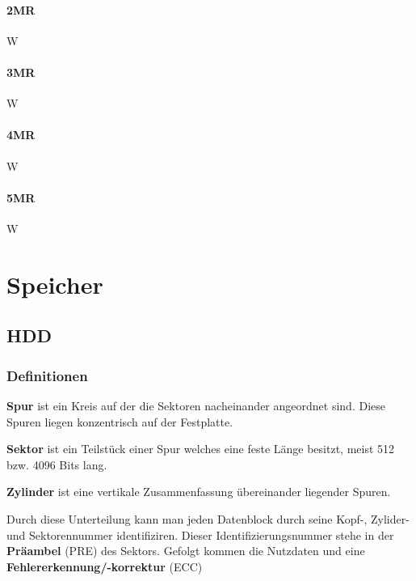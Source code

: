 \documentclass[a4paper, landscape]{article}
\newcommand*\spaceline{\par\vspace{\belowdisplayskip}}
\begin{document}
\begin{multicols}{3}
        \paragraph{2MR} W
        
        \paragraph{3MR} W
        
        \paragraph{4MR} W
        
        \paragraph{5MR} W
        
        \section{Speicher}
        
        \subsection{HDD}
        
        \subsubsection{Definitionen}
        \textbf{Spur} ist ein Kreis auf der die Sektoren nacheinander angeordnet sind. Diese Spuren liegen konzentrisch auf der Festplatte.
        \spaceline
        \textbf{Sektor} ist ein Teilstück einer Spur welches eine feste Länge besitzt, meist 512 bzw. 4096 Bits lang.
        \spaceline
        \textbf{Zylinder} ist eine vertikale Zusammenfassung übereinander liegender Spuren.
        \spaceline
        Durch diese Unterteilung kann man jeden Datenblock durch seine Kopf-, Zylider- und Sektorennummer identifiziren. 
        Dieser Identifizierungsnummer stehe in der \textbf{Präambel} (PRE) des Sektors. 
        Gefolgt kommen die Nutzdaten und eine \textbf{Fehlererkennung/-korrektur} (ECC)
        
        \begin{center}
        \end{center}


\end{multicols}
\end{document}
